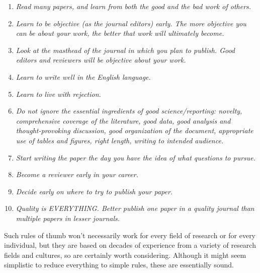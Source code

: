 \documentclass[graybox,envcountchap,sectrefs,UStrade]{svmono}
\begin{document}
\begin{enumerate}
  \item \emph{Read many papers, and learn from both the good and the bad work of others.}
  \item \emph{Learn to be objective (as the journal editors) early. The more objective you can be about your work, the better that work will ultimately become.}
  \item \emph{Look at the masthead of the journal in which you plan to publish. Good editors and reviewers will be objective about your work.}
  \item \emph{Learn to write well in the English language.}
  \item \emph{Learn to live with rejection.}
  \item \emph{Do not ignore the essential ingredients of good science/reporting: novelty, comprehensive coverage of the literature, good data, good analysis and thought-provoking discussion, good organization of the document, appropriate use of tables and figures, right length, writing to intended audience.}
  \item \emph{Start writing the paper the day you have the idea of what questions to pursue.}
  \item \emph{Become a reviewer early in your career.}
  \item \emph{Decide early on where to try to publish your paper.}
  \item \emph{Quality is EVERYTHING. Better publish one paper in a quality journal than multiple papers in lesser journals.}
\end{enumerate}

Such rules of thumb won't necessarily work for every field of research or for every individual, but they are based on decades of experience from a variety of research fields and cultures, so are certainly worth considering. Although it might seem simplistic to reduce everything to simple rules, these are essentially sound. \par
\end{document}
